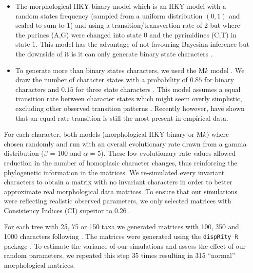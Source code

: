 \documentclass[12pt,letterpaper]{article}
\begin{document}
\begin{itemize}
    \item The morphological HKY-binary model \citep{OReilly20160081} which is an HKY model \citep{HKY85} with a random states frequency (sampled from a uniform distribution $(0,1)$ and scaled to sum to $1$)
     and using a transition/transvertion rate of $2$ \citep{douadycomparison2003} but where the purines (A,G) were changed into state $0$ and the pyrimidines (C,T) in state $1$.
    This model has the advantage of not favouring Bayesian inference \citep[since it doesn't use an M$k$ model;][; see discussion]{OReilly20160081} but the downside of it is it can only generate binary state characters \citep[or 4 states;][]{puttick2017uncertain}.
    \item To generate more than binary states characters, we used the M$k$ model \citep{lewisa2001}.
    We draw the number of character states with a probability of $0.85$ for binary characters and $0.15$ for three state characters \citep{Guillerme2016146,ZouConvergence}.
    This model assumes a equal transition rate between character states which might seem overly simplistic, excluding other observed transition patterns \citep[e.g. Dollo characters;][]{Dollo,wright2015came}.
    Recently however, \cite{Wright01072016} have shown that an equal rate transition is still the most present in empirical data.
\end{itemize}

\noindent For each character, both models (morphological HKY-binary or M$k$) where chosen randomly and run with an overall evolutionary rate drawn from a gamma distribution ($\beta$ = $100$ and $\alpha$ = $5$).
These low evolutionary rate values allowed reduction in the number of homoplasic character changes, thus reinforcing the phylogenetic information in the matrices.
We re-simulated every invariant characters to obtain a matrix with no invariant characters in order to better approximate real morphological data matrices.
To ensure that our simulations were reflecting realistic observed parameters, we only selected matrices with Consistency Indices (CI) superior to $0.26$ \citep{OReilly20160081}.

For each tree with 25, 75 or 150 taxa we generated matrices with 100, 350 and 1000 characters following \cite{OReilly20160081}.
The matrices were generated using the \texttt{dispRity R} package \citep{thomas_guillerme_2016_55646}.
To estimate the variance of our simulations and assess the effect of our random parameters, we repeated this step 35 times resulting in 315 ``normal'' morphological matrices.
\end{document}
